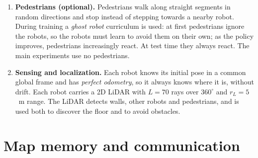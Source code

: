 \documentclass[11pt,a4paper]{article}
\begin{document}
\begin{enumerate}[label=\textbf{\arabic*.}]
\item \textbf{Pedestrians (optional).}
Pedestrians walk along straight segments in random directions and stop
instead of stepping towards a nearby robot. During training a
\emph{ghost robot} curriculum is used: at first pedestrians ignore the robots,
so the robots must learn to avoid them on their own; as the policy improves,
pedestrians increasingly react. At test time they always react. The main
experiments use no pedestrians.

\item \textbf{Sensing and localization.}
Each robot knows its initial pose in a common global frame and has
\emph{perfect odometry}, so it always knows where it is, without drift.
Each robot carries a 2D LiDAR with $L=70$ rays over $360^\circ$ and
$r_L=5$~m range. The LiDAR detects walls, other robots and pedestrians, and
is used both to discover the floor and to avoid obstacles.

\end{enumerate}

\section*{Map memory and communication}
\end{document}
